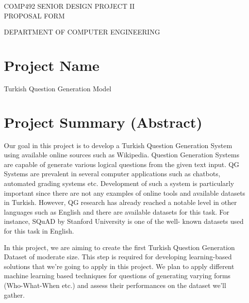 \documentclass[10pt]{article}
\begin{document}
	

	
	\begin{spacing}{1.1}
	{\color{azure}
		\bfseries
		\huge{
			\noindent
			COMP492 SENIOR DESIGN PROJECT II \hspace{0pt} \\
			PROPOSAL FORM \par
		}
		\large{
			\noindent
			DEPARTMENT OF COMPUTER ENGINEERING \newline \par
		}
	}
	\end{spacing}
	\vspace{-2em}
	\section{Project Name}
	
	Turkish Question Generation Model
	

	\section{Project Summary (Abstract)}
	
	Our goal in this project is to develop a Turkish Question Generation System using available online sources such as Wikipedia. Question Generation Systems are capable of generate various logical questions from the given text input. QG Systems are prevalent in several computer applications such as chatbots, automated grading systems etc. Development of such a system is particularly important since there are not any examples of online tools and available datasets in Turkish. However, QG research has already reached a notable level in other languages such as English and there are available datasets for this task. For instance, SQuAD by Stanford University is one of the well- known datasets used for this task in English. \newline \par
	
	In this project, we are aiming to create the first Turkish Question Generation Dataset of moderate size. This step is required for developing learning-based solutions that we’re going to apply in this project. We plan to apply different machine learning based techniques for questions of generating varying forms (Who-What-When etc.) and assess their performances on the dataset we’ll gather. \newline \par
	
\end{document}
